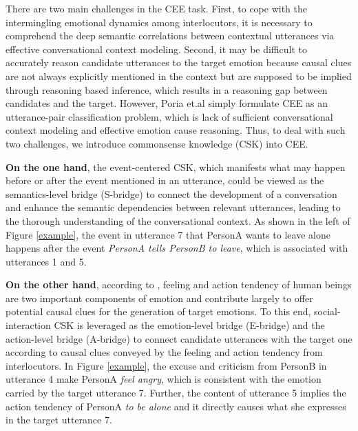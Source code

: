 \documentclass[letterpaper]{article} \usepackage{aaai23}  \usepackage{times}  \usepackage{helvet}  \usepackage{courier}  \usepackage[hyphens]{url}  \usepackage{graphicx} \urlstyle{rm} \def\UrlFont{\rm}  \usepackage{natbib}  \usepackage{caption} \frenchspacing  \setlength{\pdfpagewidth}{8.5in} \setlength{\pdfpageheight}{11in} \usepackage{algorithm}
\begin{document}
There are two main challenges in the CEE task. First, to cope with the intermingling emotional dynamics among interlocutors, it is necessary to comprehend the deep semantic correlations between contextual utterances via effective conversational context modeling. Second, it may be difficult to accurately reason candidate utterances to the target emotion because causal clues are not always explicitly mentioned in the context but are supposed to be implied through reasoning based inference, which results in a reasoning gap between candidates and the target. However, Poria et.al  simply formulate CEE as an utterance-pair classification problem, which is lack of sufficient conversational context modeling and effective emotion cause reasoning. Thus, to deal with such two challenges, we introduce commonsense knowledge (CSK) \cite{csk} into CEE.



\textbf{On the one hand}, the event-centered CSK, which manifests what may happen before or after the event mentioned in an utterance, could be viewed as the semantics-level bridge (S-bridge) to connect the development of a conversation and enhance the semantic dependencies between relevant utterances, leading to the thorough understanding of the conversational context. As shown in the left of Figure \ref{example}, the event in utterance 7 that PersonA wants to leave alone happens after the event \emph{PersonA tells PersonB to leave}, which is associated with utterances 1 and 5.

\textbf{On the other hand}, according to \cite{theory}, feeling and action tendency of human beings are two important components of emotion and contribute largely to offer potential causal clues for the generation of target emotions. To this end, social-interaction CSK is leveraged as the emotion-level bridge (E-bridge) and the action-level bridge (A-bridge) to connect candidate utterances with the target one according to causal clues conveyed by the feeling and action tendency from interlocutors. In Figure \ref{example}, the excuse and criticism from PersonB in utterance 4 make PersonA \emph{feel angry}, which is consistent with the emotion carried by the target utterance 7. Further, the content of utterance 5 implies the action tendency of PersonA \emph{to be alone} and it directly causes what she expresses in the target utterance 7.
\end{document}
